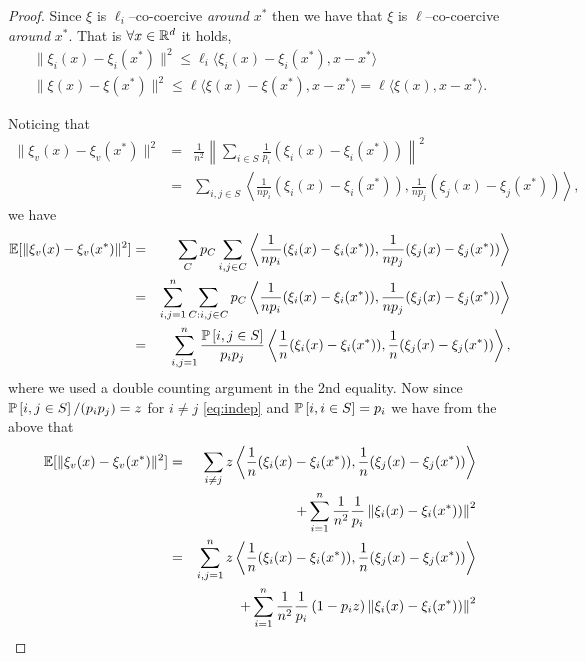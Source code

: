 \documentclass{article}
\begin{document}
\begin{proof}
Since $\xi$ is $\ell_i$--co-coercive \emph{around} $x^*$ then we have that $\xi$ is $\ell$--co-coercive \emph{around} $x^*$. That is $ \forall x \in \mathbb{R}^d$ it holds,
\begin{align}
\label{naosknal1}
\|\xi_i(x)-\xi_i(x^*)\|^2 \leq \ell_i \langle\xi_i(x)-\xi_i(x^*),x-x^*\rangle\\
\label{naosknal2}
\|\xi(x)-\xi(x^*)\|^2 \leq \ell \langle\xi(x)-\xi(x^*),x-x^*\rangle= \ell \langle\xi(x),x-x^*\rangle.
\end{align}

Noticing that 
\begin{eqnarray*}
\|\xi_v(x) - \xi_v(x^*)\|^2 &=& \frac{1}{n^2} \left \|\sum_{i\in S}\frac{1}{p_i}(\xi_i(x) - \xi_i(x^*)) \right \|^2 \\
&=& \sum_{i,j\in S} \left\langle \frac{1}{np_i}(\xi_i(x) - \xi_i(x^*)), \frac{1}{np_j}(\xi_j(x) - \xi_j(x^*)) \right\rangle,
\end{eqnarray*}
we have 
\begin{eqnarray*}
\mathbb{E}[\|\xi_v(x) - \xi_v(x^*)\|^2] &=& \sum_C p_C  \sum_{i,j\in C} \left\langle \frac{1}{np_i}(\xi_i(x) - \xi_i(x^*)), \frac{1}{np_j}(\xi_j(x) - \xi_j(x^*)) \right\rangle \\ 
&=& \sum_{i, j=1}^n \sum_{C: i,j\in C }p_C  \left\langle \frac{1}{np_i}(\xi_i(x) - \xi_i(x^*)), \frac{1}{np_j}(\xi_j(x) - \xi_j(x^*)) \right\rangle \\ 
&=& \sum_{i, j=1}^n \frac{\mathbb{P} \left[ i,j \in S\right]}{p_ip_j} \left\langle \frac{1}{n}(\xi_i(x) - \xi_i(x^*)), \frac{1}{n}(\xi_j(x) - \xi_j(x^*)) \right\rangle,
\end{eqnarray*}
where we used a double counting argument in the 2nd equality.
Now since $\mathbb{P} \left[ i,j \in S\right]/(p_ip_j) =z$ for $i \neq j$ \eqref{eq:indep} and $\mathbb{P} \left[ i,i \in S\right]=p_i$ we have from the above that
\begin{eqnarray}
\mathbb{E}[\|\xi_v(x) - \xi_v(x^*)\|^2] &=& 
\sum_{i \neq j} z \left\langle \frac{1}{n}(\xi_i(x) - \xi_i(x^*)), \frac{1}{n}(\xi_j(x) - \xi_j(x^*)) \right\rangle  \notag\\
& &\qquad + \sum_{i=1}^n\frac{1}{n^2} \frac{1}{p_i} \norm{\xi_i(x) - \xi_i(x^*))}^2 \notag\\
&= &  \sum_{i,j=1}^n z \left\langle \frac{1}{n}(\xi_i(x) - \xi_i(x^*)), \frac{1}{n}(\xi_j(x) - \xi_j(x^*)) \right\rangle \notag\\
\label{nxasnxkl}
& &+ \sum_{i=1}^n\frac{1}{n^2} \frac{1}{p_i}\left(1 -p_i z \right) \norm{\xi_i(x) - \xi_i(x^*))}^2\\

\end{eqnarray}
\end{proof}
\end{document}
